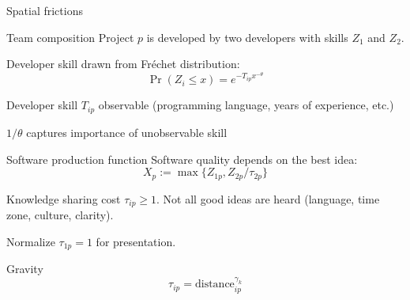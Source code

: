 \documentclass[
  ignorenonframetext,
  aspectratio=169,
]{beamer}
\begin{document}
\begin{frame}{Spatial frictions}
\protect\hypertarget{spatial-frictions}{}
\end{frame}

\begin{frame}{Team composition}
\protect\hypertarget{team-composition}{}
Project \(p\) is developed by two developers with skills \(Z_1\) and
\(Z_2\).

Developer skill drawn from Fréchet distribution: \[
\Pr(Z_i \le x) = e^{-T_{ip}x^{-\theta}}
\]

\begin{block}{Developer skill}
\protect\hypertarget{developer-skill}{}
\(T_{ip}\) observable (programming language, years of experience, etc.)

\(1/\theta\) captures importance of unobservable skill
\end{block}
\end{frame}

\begin{frame}{Software production function}
\protect\hypertarget{software-production-function}{}
Software quality depends on the best idea: \[
X_p := \max \{Z_{1p}, Z_{2p}/\tau_{2p}\}
\]

\begin{block}{Knowledge sharing cost}
\protect\hypertarget{knowledge-sharing-cost}{}
\(\tau_{ip} \ge 1\). Not all good ideas are heard (language, time zone,
culture, clarity).

Normalize \(\tau_{1p}=1\) for presentation.
\end{block}

\begin{block}{Gravity}
\protect\hypertarget{gravity}{}
\[
\tau_{ip} = \text{distance}_{ip}^{\gamma_k}
\]
\end{block}
\end{frame}
\end{document}
